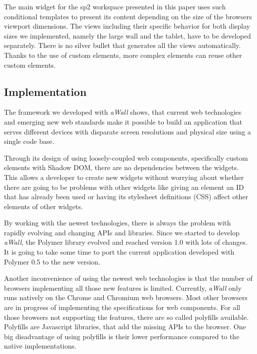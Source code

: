\documentclass{sigchi}
\begin{document}
The main widget for the \gls{sp2} workspace presented in this paper uses such conditional templates to present its content depending on the size of the browsers viewport dimensions.
The views including their specific behavior for both display sizes we implemented, namely the large wall and the tablet, have to be developed separately.
There is no silver bullet that generates all the views automatically.
Thanks to the use of custom elements, more complex elements can reuse other custom elements.


\subsection{Implementation}
The framework we developed with \textit{aWall} shows, that current web technologies and emerging new web standards make it possible to build an application that serves different devices with disparate screen resolutions and physical size using a single code base. 

Through its design of using loosely-coupled web components, specifically custom elements with Shadow DOM, there are no dependencies between the widgets.
This allows a developer to create new widgets without worrying about whether there are going to be problems with other widgets like  giving an element an ID that has already been used or having its stylesheet definitions (CSS) affect other elements of other widgets.

By working with the newest technologies, there is always the problem with rapidly evolving and changing APIs and libraries.
Since we started to develop \textit{aWall}, the Polymer library evolved and reached version 1.0 with lots of changes.
It is going to take some time to port the current application developed with Polymer 0.5 to the new version. 

Another inconvenience of using the newest web technologies is that the number of browsers implementing all those new features is limited.
Currently, \textit{aWall} only runs natively on the Chrome and Chromium web browsers.
Most other browsers are in progress of implementing the specifications for web components.
For all those browsers not supporting the features, there are so called polyfills available.
Polyfills are Javascript libraries, that add the missing APIs to the browser.
One big disadvantage of using polyfills is their lower performance compared to the native implementations.
\end{document}
